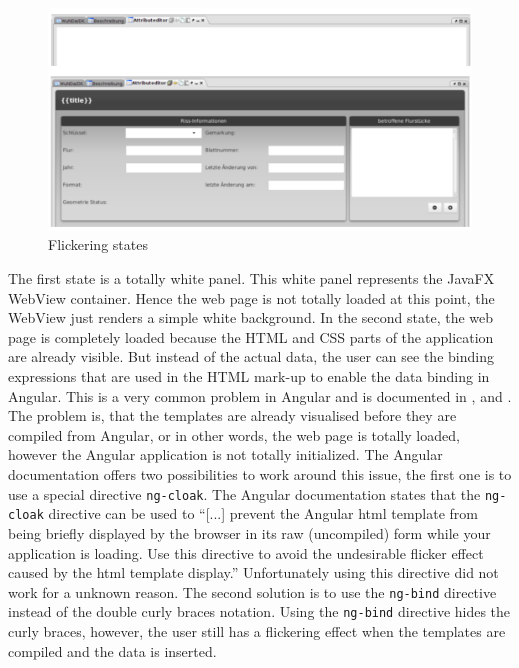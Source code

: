 \begin{figure}
\centering \includegraphics[width=1.0\textwidth]{./img/impl/flickering_states.png}
	\caption{Flickering states}
	\label{fig:flickering}
\end{figure}
The first state is a totally white panel. This white panel represents the JavaFX WebView container. Hence the web page is not totally loaded at this point, the WebView just renders a simple white background. 
In the second state, the web page is completely loaded because the HTML and CSS parts of the application are already visible. 
But instead of the actual data, the user can see the binding expressions that are used in the HTML mark-up to enable the data binding in Angular. 
This is a very common problem in Angular and is documented in \autocite{impl:ng-cloak}, \autocite{impl:ng-bind} and \autocite{impl:stackoverflow-ng-cloak}. 
The problem is, that the templates are already visualised before they are compiled from Angular, or in other words, the web page is totally loaded, however the Angular application is not totally initialized. 
The Angular documentation offers two possibilities to work around this issue, the first one is to use a special directive \texttt{ng-cloak}. 
The Angular documentation states that the \texttt{ng-cloak} directive can be used to \enquote{[...] prevent the Angular html template from being briefly displayed by the browser in its raw (uncompiled) form while your application is loading. Use this directive to avoid the undesirable flicker effect caused by the html template display.} \autocite{impl:ng-cloak}
Unfortunately using this directive did not work for a unknown reason. 
The second solution is to use the \texttt{ng-bind} directive instead of the double curly braces notation.
Using the \texttt{ng-bind} directive hides the curly braces, however, the user still has a flickering effect when the templates are compiled and the data is inserted.

